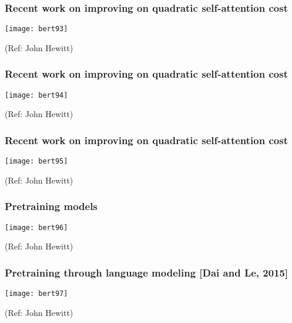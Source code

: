 \begin{frame}[fragile]\frametitle{Recent work on improving on quadratic self-attention cost}

			
			\begin{center}
			\texttt{[image: bert93]}
			\end{center}		
			
			{\tiny (Ref: John Hewitt)}

\end{frame}

\begin{frame}[fragile]\frametitle{Recent work on improving on quadratic self-attention cost}

			
			\begin{center}
			\texttt{[image: bert94]}
			\end{center}		
			
			{\tiny (Ref: John Hewitt)}

\end{frame}

\begin{frame}[fragile]\frametitle{Recent work on improving on quadratic self-attention cost}

			
			\begin{center}
			\texttt{[image: bert95]}
			\end{center}		
			
			{\tiny (Ref: John Hewitt)}

\end{frame}

\begin{frame}[fragile]\frametitle{Pretraining models}

			
			\begin{center}
			\texttt{[image: bert96]}
			\end{center}		
			
			{\tiny (Ref: John Hewitt)}

\end{frame}

\begin{frame}[fragile]\frametitle{Pretraining through language modeling [Dai and Le, 2015]}

			
			\begin{center}
			\texttt{[image: bert97]}
			\end{center}		
			
			{\tiny (Ref: John Hewitt)}

\end{frame}

